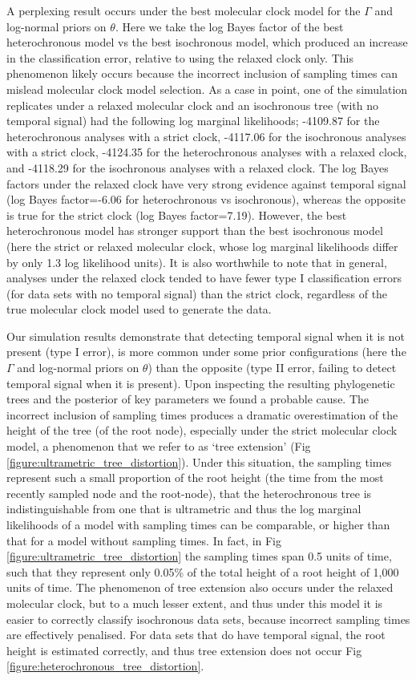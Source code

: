\documentclass[10pt,letterpaper]{article}
\begin{document}
A perplexing result occurs under the best molecular clock model for the $\Gamma$ and log-normal priors on $\theta$. Here we take the log Bayes factor of the best heterochronous model vs the best isochronous model, which produced an increase in the classification error, relative to using the relaxed clock only. This phenomenon likely occurs because the incorrect inclusion of sampling times can mislead molecular clock model selection. As a case in point, one of the simulation replicates under a relaxed molecular clock and an isochronous tree (with no temporal signal) had the following log marginal likelihoods; -4109.87 for the heterochronous analyses with a strict clock, -4117.06 for the isochronous analyses with a strict clock, -4124.35 for the heterochronous analyses with a relaxed clock, and -4118.29 for the isochronous analyses with a relaxed clock. The log Bayes factors under the relaxed clock have very strong evidence against temporal signal (log Bayes factor=-6.06 for heterochronous vs isochronous), whereas the opposite is true for the strict clock (log Bayes factor=7.19). However, the best heterochronous model has stronger support than the best isochronous model (here the strict or relaxed molecular clock, whose log marginal likelihoods differ by only 1.3 log likelihood units). It is also worthwhile to note that in general, analyses under the relaxed clock tended to have fewer type I classification errors (for data sets with no temporal signal) than the strict clock, regardless of the true molecular clock model used to generate the data.

Our simulation results demonstrate that detecting temporal signal when it is not present (type I error), is more common under some prior configurations (here the $\Gamma$ and log-normal priors on $\theta$) than the opposite (type II error, failing to detect temporal signal when it is present). Upon inspecting the resulting phylogenetic trees and the posterior of key parameters we found a probable cause. The incorrect inclusion of sampling times produces a dramatic overestimation of the height of the tree (of the root node), especially under the strict molecular clock model, a phenomenon that we refer to as `tree extension' (Fig \ref{figure:ultrametric_tree_distortion}). Under this situation, the sampling times represent such a small proportion of the root height (the time from the most recently sampled node and the root-node), that the heterochronous tree is indistinguishable from one that is ultrametric and thus the log marginal likelihoods of a model with sampling times can be comparable, or higher than that for a model without sampling times. In fact, in Fig \ref{figure:ultrametric_tree_distortion} the sampling times span 0.5 units of time, such that they represent only 0.05\% of the total height of a root height of 1,000 units of time. The phenomenon of tree extension also occurs under the relaxed molecular clock, but to a much lesser extent, and thus under this model it is easier to correctly classify isochronous data sets, because incorrect sampling times are effectively penalised. For data sets that do have temporal signal, the root height is estimated correctly, and thus tree extension does not occur Fig \ref{figure:heterochronous_tree_distortion}. 
\end{document}
